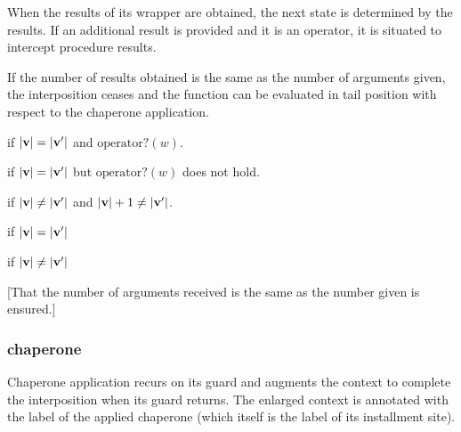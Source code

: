 
When the results of its wrapper are obtained, the next state is determined by the results.
If an additional result is provided and it is an operator, it is situated to intercept procedure results.

If the number of results obtained is the same as the number of arguments given, the interposition ceases and the function can be evaluated in tail position with respect to the chaperone application.


if $|\mathbf{v}|=|\mathbf{v'}|$ and $\mathrm{operator?}(w)$.

if $|\mathbf{v}|=|\mathbf{v'}|$ but $\mathrm{operator?}(w)$ does not hold.

if $|\mathbf{v}|\ne|\mathbf{v'}|$ and $|\mathbf{v}|+1\ne|\mathbf{v'}|$.







\red{\sval{\impcrk{\vv}::\ks}{\sigma}{\vvp}}{\sval{\ks}{\sigma}{\vvp}}
if $|\mathbf{v}|=|\mathbf{v'}|$

if $|\mathbf{v}|\ne|\mathbf{v'}|$

[That the number of arguments received is the same as the number given is ensured.]



\subsubsection{chaperone}

Chaperone application recurs on its guard and augments the context to complete the interposition when its guard returns.
The enlarged context is annotated with the label of the applied chaperone (which itself is the label of its installment site).


